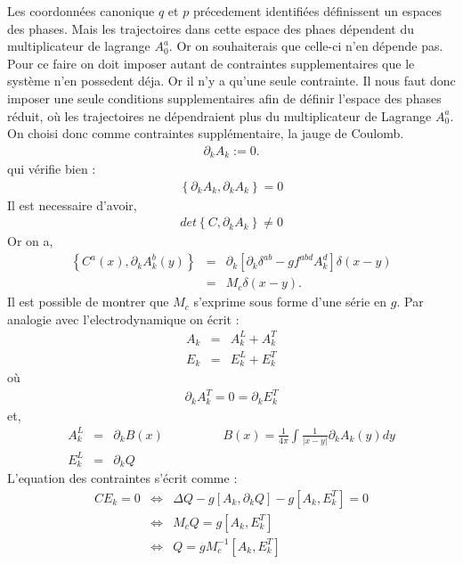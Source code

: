 \documentclass[a4paper,11pt]{article} %
\theoremstyle{plain}
\theoremstyle{definition}
\theoremstyle{remark}
\numberwithin{equation}{section}
\numberwithin{equation}{subsection}
\numberwithin{figure}{section}
\begin{document}
\noindent
Les coordonnées canonique $q$ et $p$ précedement identifiées définissent un espaces des phases. Mais les trajectoires dans cette espace des phaes dépendent du multiplicateur de lagrange $A^{a}_{0}$. Or on souhaiterais que celle-ci n'en dépende pas. Pour ce faire on doit imposer autant de contraintes supplementaires que le système n'en possedent déja. 
Or il n'y a qu'une seule contrainte. Il nous faut donc imposer une seule conditions supplementaires afin de définir l'espace des phases réduit, où les trajectoires ne dépendraient plus du multiplicateur de Lagrange $A^{a}_{0}$. On choisi donc comme contraintes supplémentaire, la jauge de Coulomb.
\begin{eqnarray*}
 \partial_{k} A_{k} := 0.
\end{eqnarray*}
qui vérifie bien :
\begin{eqnarray*}
 \left \{  \partial_{k} A_{k} , \partial_{k} A_{k} \right \} = 0
\end{eqnarray*}
Il est necessaire d'avoir,
\begin{eqnarray*}
 det \left \{ C,  \partial_{k} A_{k}  \right \}  \ne  0
\end{eqnarray*}
Or on a,
\begin{eqnarray*}
  \left \{ C^{a}(x) , \partial_{k} A^{b}_{k} (y) \right \} &=& \partial_{k} \left [ \partial_{k} \delta^{ab} - g f^{abd} A_{k}^{d} \right ] \delta(x-y)  \\
                                                             &=&   M_{c} \delta(x-y).
\end{eqnarray*}
Il est possible de montrer que $M_{c}$ s'exprime sous forme d'une série en $g$. Par analogie avec l'electrodynamique on écrit :
\begin{eqnarray*}
 A_{k}  &=&   A_{k}^{L}  +   A_{k}^{T}  \\
 E_{k}  &=&   E_{k}^{L}  +  E_{k}^{T}  
\end{eqnarray*}
où 
\begin{eqnarray*}
 \partial_{k}  A_{k}^{T}  = 0  =  \partial_{k}  E_{k}^{T}
\end{eqnarray*}
et,
\begin{eqnarray*}
 A_{k}^{L}   &=&  \partial_{k}  B(x)  \hspace{2cm}  B(x) = \frac{1}{4 \pi}  \int \frac{1}{|x-y|}  \partial_{k}  A_{k}  (y)  dy       \\
 E_{k}^{L} &=& \partial_{k}  Q
\end{eqnarray*}
L'equation des contraintes s'écrit comme :
\begin{eqnarray*}
 C E_{k} = 0 & \Leftrightarrow & \Delta Q - g[A_k , \partial_k Q ] - g[ A_k , E^{T}_{k}  ]  =  0  \\
             & \Leftrightarrow & M_{c} Q =  g[ A_k , E^{T}_{k} ]  \\
             & \Leftrightarrow & Q =  g M_{c}^{-1} [ A_k , E^{T}_{k} ]
\end{eqnarray*}
\end{document}
